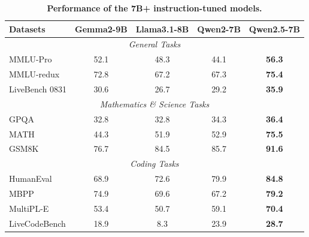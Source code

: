 \begin{table}[t]

\centering

\caption{\textbf{Performance of the 7B+ instruction-tuned models.}}

\label{tab:7b-instruct}
\small
\setlength{\tabcolsep}{2.6pt}

\begin{tabular}{@{}lcccc@{}}

\toprule

\textbf{Datasets} & \textbf{Gemma2-9B} & \textbf{Llama3.1-8B} & \textbf{Qwen2-7B} & \textbf{Qwen2.5-7B} \\

\midrule

\multicolumn{5}{c}{\textit{General Tasks}} \\

\midrule

MMLU-Pro & 52.1 & 48.3 & 44.1 & \textbf{56.3} \\

MMLU-redux & 72.8 & 67.2 & 67.3 & \textbf{75.4} \\

LiveBench 0831 & 30.6 & 26.7 & 29.2 & \textbf{35.9} \\

\midrule

\multicolumn{5}{c}{\textit{Mathematics \& Science Tasks}} \\

\midrule

GPQA & 32.8 & 32.8 & 34.3 & \textbf{36.4} \\

MATH & 44.3 & 51.9 & 52.9 & \textbf{75.5} \\

GSM8K & 76.7 & 84.5 & 85.7 & \textbf{91.6} \\

\midrule

\multicolumn{5}{c}{\textit{Coding Tasks}} \\

\midrule

HumanEval & 68.9 & 72.6 & 79.9 & \textbf{84.8} \\

MBPP & 74.9 & 69.6 & 67.2 & \textbf{79.2} \\

MultiPL-E & 53.4 & 50.7 & 59.1 & \textbf{70.4} \\

LiveCodeBench & 18.9 & 8.3 & 23.9 & \textbf{28.7} \\


\end{tabular}
\end{table}

